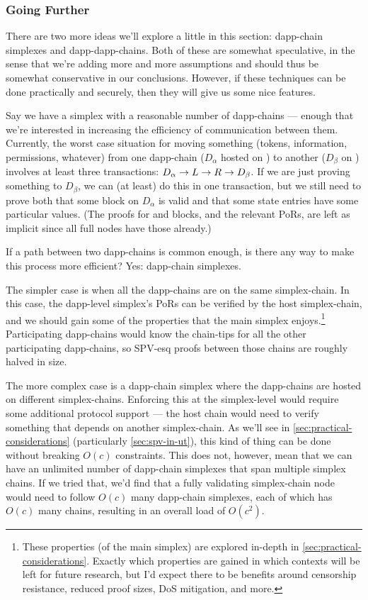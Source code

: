 \subsubsection{Going Further}

There are two more ideas we'll explore a little in this section: dapp-chain simplexes and dapp-dapp-chains.
Both of these are somewhat speculative, in the sense that we're adding more and more assumptions and should thus be somewhat conservative in our conclusions.
However, if these techniques can be done practically and securely, then they will give us some nice features.


\providecommand\dcA{\ensuremath{D_\alpha}\xspace}
\providecommand\dcB{\ensuremath{D_\beta}\xspace}

Say we have a simplex with a reasonable number of dapp-chains --- enough that we're interested in increasing the efficiency of communication between them.
Currently, the worst case situation for moving something (tokens, information, permissions, whatever) from one dapp-chain (\dcA hosted on \cL) to another (\dcB on \cR) involves at least three transactions: $\dcA \to \cL \to \cR \to \dcB$.
If we are just proving something to \dcB, we can (at least) do this in one transaction, but we still need to prove both that some block on \dcA is valid and that some state entries have some particular values.
(The proofs for \cL and \cR blocks, and the relevant PoRs, are left as implicit since all full nodes have those already.)

If a path between two dapp-chains is common enough, is there any way to make this process more efficient? Yes: dapp-chain simplexes.

The simpler case is when all the dapp-chains are on the same simplex-chain.
In this case, the dapp-level simplex's PoRs can be verified by the host simplex-chain, and we should gain some of the properties that the main simplex enjoys.\footnote{
    These properties (of the main simplex) are explored in-depth in \autoref{sec:practical-considerations}.
    Exactly which properties are gained in which contexts will be left for future research, but I'd expect there to be benefits around censorship resistance, reduced proof sizes, DoS mitigation, and more.
}
Participating dapp-chains would know the chain-tips for all the other participating dapp-chains, so SPV-esq proofs between those chains are roughly halved in size.

The more complex case is a dapp-chain simplex where the dapp-chains are hosted on different simplex-chains.
Enforcing this at the simplex-level would require some additional protocol support --- the host chain would need to verify something that depends on another simplex-chain.
As we'll see in \autoref{sec:practical-considerations} (particularly \autoref{sec:spv-in-ut}), this kind of thing can be done without breaking $O(c)$ constraints.
This does not, however, mean that we can have an unlimited number of dapp-chain simplexes that span multiple simplex chains.
If we tried that, we'd find that a fully validating simplex-chain node would need to follow $O(c)$ many dapp-chain simplexes, each of which has $O(c)$ many chains, resulting in an overall load of $O(c^2)$.

